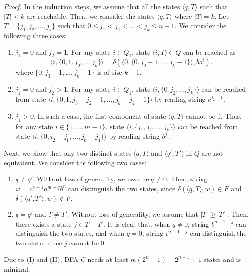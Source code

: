 \documentclass[10pt]{article}
\begin{document}
\begin{proof}
    In the induction steps, we assume that all the states $\langle q, T \rangle$ such that $|T| < k$ are reachable.
    Then, we consider the states $\langle q, T \rangle$ where $|T| = k$.
    Let $T = \{j_1, j_2, \ldots, j_k\}$ such that $0 \le j_1 < j_2 < \ldots < j_k \le n-1$.
    We consider the following three cases:
    \begin{enumerate}
    \item $j_1 = 0$ and $j_2 = 1$.
    For any state $i \in Q_1$, state $\langle i , T \rangle \in Q$ can be reached as
    \[
    \langle i, \{0, 1, j_3, \ldots, j_k\} \rangle = \delta(\langle 0, \{0, j_3 - 1, \ldots, j_k - 1\}\rangle, ba^{i}),
    \]
    where $\{0, j_3 - 1, \ldots, j_k - 1\}$ is of size $k-1$.

    \item $j_1 = 0$ and $j_2 > 1$.
    For any state $i \in Q_1$, state $\langle i, \{0, j_2, \ldots, j_k\} \rangle$ can be reached from state $\langle i, \{0, 1, j_3 - j_2 + 1, \ldots, j_k - j_2 + 1\} \rangle$ by reading string $c^{j_2 - 1}$.

    \item $j_1 > 0$.
    In such a case, the first component of state $\langle q, T \rangle$ cannot be $0$.
    Thus, for any state $i \in \{1, \ldots, m-1\}$, state $\langle i, \{j_1, j_2, \ldots, j_k\} \rangle$ can be reached from state $\langle i, \{0, j_2 - j_1, \ldots, j_k - j_1\} \rangle$ by reading string $b^{j_1}$.
    \end{enumerate}

    Next, we show that any two distinct states $\langle q, T \rangle$ and $\langle q', T' \rangle$ in $Q$ are not equivalent.
    We consider the following two cases:
    \begin{enumerate}
    \item $q \neq q'$.
    Without loss of generality, we assume $ q \neq 0$.
    Then, string $w = c^{n-1}a^{m-q}b^{n}$ can distinguish the two states, since $\delta(\langle q, T \rangle, w) \in F$ and $\delta(\langle q', T' \rangle, w) \not\in F$.

    \item $q = q'$ and $T \neq T'$.
    Without loss of generality, we assume that $|T| \ge |T'|$.
    Then, there exists a state $j \in T - T'$.
    It is clear that, when $q \neq 0$, string $b^{n-1-j}$ can distinguish the two states, and when $q = 0$, string $c^{n-1-j}$ can distinguish the two states since $j$ cannot be $0$.
    \end{enumerate}

    Due to (I) and (II), DFA $C$ needs at least $m(2^n-1) - 2^{n-1} + 1$ states and is minimal.
\end{proof}
\end{document}
